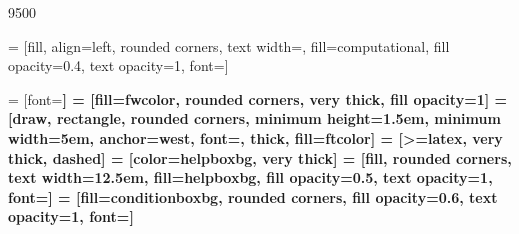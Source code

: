 \setlength{\intextsep}{25pt}

 9500 %
\raggedbottom

\usepackage{tikz}
\usetikzlibrary{arrows, positioning, fit, backgrounds, calc}

\usepackage{pgfplots}
\pgfplotsset{compat=newest}


 = [fill, align=left, rounded corners, text width=\textwidth, fill=computational, fill opacity=0.4, text opacity=1, font=\small]




 = [font=\bf\ttfamily]
 = [fill=fwcolor, rounded corners, very thick, fill opacity=1]
 = [draw, rectangle, rounded corners, minimum height=1.5em, minimum width=5em, anchor=west, font=\footnotesize\ttfamily, thick, fill=ftcolor]
 = [>=latex, very thick, dashed]
 = [color=helpboxbg, very thick]
 = [fill, rounded corners, text width=12.5em, fill=helpboxbg, fill opacity=0.5, text opacity=1, font=\small]
 = [fill=conditionboxbg, rounded corners, fill opacity=0.6, text opacity=1, font=\footnotesize]



\usepackage{hyperref}
\hypersetup{
    colorlinks=true,
    linkcolor=black,
    filecolor=magenta,      
    urlcolor=blue,
}


\usepackage{ifthen}

\newcommand{\tocite}{\todo[inline]{CITE}}


\newcommand{\code}[1]{\texttt{\hl{#1}}}
\newcommand{\link}[2] {\hyperref[#1]{\textcolor{link}{#2}}}
\newcommand{\firetask}[1] {\hyperref[automation:sec-#1]{\textcolor{black}{\texttt{#1}}}}
\newcommand{\vasp}[1] {\hyperref[appendix:sec-#1]{\textcolor{link}{\texttt{#1}}}}
 
